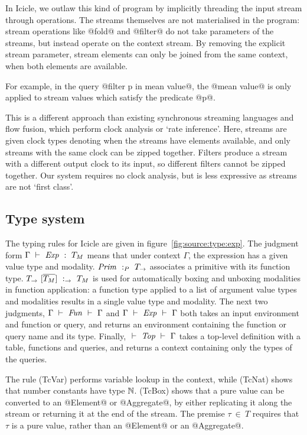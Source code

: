 In Icicle, we outlaw this kind of program by implicitly threading the input stream through operations.
The streams themselves are not materialised in the program: stream operations like @fold@ and @filter@ do not take parameters of the streams, but instead operate on the context stream.
By removing the explicit stream parameter, stream elements can only be joined from the same context, when both elements are available.

For example, in the query @filter p in mean value@, the @mean value@ is only applied to stream values which satisfy the predicate @p@.

This is a different approach than existing synchronous streaming languages\cite{mandel2010lucy} and flow fusion\cite{lippmeier2013data}, which perform clock analysis or `rate inference'.
Here, streams are given clock types denoting when the streams have elements available, and only streams with the same clock can be zipped together.
Filters produce a stream with a different output clock to its input, so different filters cannot be zipped together.
Our system requires no clock analysis, but is less expressive as streams are not `first class'.

\subsection{Type system}

The typing rules for Icicle are given in figure~\ref{fig:source:type:exp}.
The judgment form $\Gamma ~\vdash~ \mathit{Exp}~:~T_M$ means that under context $\Gamma$, the expression has a given value type and modality.
$\mathit{Prim}~:_P~T_\to$ associates a primitive with its function type.
$T_\to~[\overline{T_M}]~:_\to~T_M$ is used for automatically boxing and unboxing modalities in function application: a function type applied to a list of argument value types and modalities results in a single value type and modality.
The next two judgments,
$\Gamma ~\vdash~ \mathit{Fun} ~\vdash~ \Gamma$ and
$\Gamma ~\vdash~ \mathit{Exp} ~\vdash~ \Gamma$
both takes an input environment and function or query, and returns an environment containing the function or query name and its type.
Finally, $ ~\vdash~ \mathit{Top} ~\vdash~ \Gamma$ takes a top-level definition with a table, functions and queries, and returns a context containing only the types of the queries.

The rule (TcVar) performs variable lookup in the context, while (TcNat) shows that number constants have type $\mathbb{N}$.
(TcBox) shows that a pure value can be converted to an @Element@ or @Aggregate@, by either replicating it along the stream or returning it at the end of the stream.
The premise $\tau~\in~T$ requires that $\tau$ is a pure value, rather than an @Element@ or an @Aggregate@.

